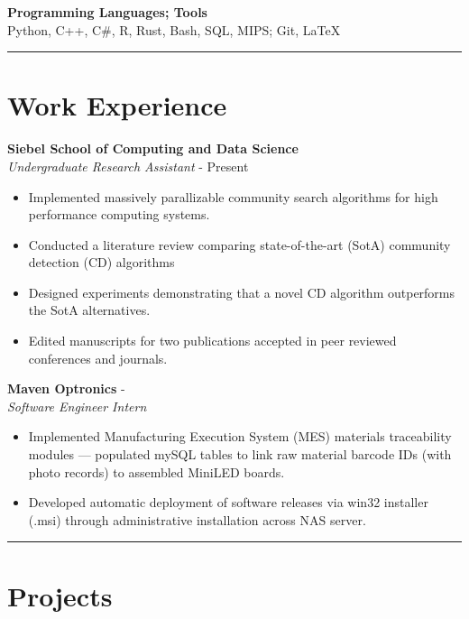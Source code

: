 \documentclass[11pt]{article}
\newcommand{\daterange}[4]{\formatdate{1}{#1}{#2} - \formatdate{1}{#3}{#4}}
\newcommand{\daterangepres}[2]{\formatdate{1}{#1}{#2} - Present}
\begin{document}
\textbf{Programming Languages; Tools} \\
Python, C++, C\#, R, Rust, Bash, SQL, MIPS; Git, \LaTeX \\

\vspace*{-5mm}
\rule{\textwidth}{0.1pt}
\vspace*{-10mm}

\section*{Work Experience}
\vspace*{-2.5mm}

\textbf{Siebel School of Computing and Data Science} \\
\emph{Undergraduate Research Assistant} \hfill \daterangepres{5}{2025}
\begin{itemize}
    \cramped
    \item Implemented massively parallizable community search algorithms for high performance computing systems.
    \item Conducted a literature review comparing state-of-the-art (SotA) community detection (CD) algorithms
    \item Designed experiments demonstrating that a novel CD algorithm outperforms the SotA alternatives.
    \item Edited manuscripts for two publications accepted in peer reviewed conferences and journals.
\end{itemize}

\textbf{Maven Optronics} \hfill \daterange{5}{2024}{8}{2024} \\
\emph{Software Engineer Intern}
\begin{itemize}
    \cramped
    \item Implemented Manufacturing Execution System (MES) materials traceability modules — populated mySQL tables to link raw material barcode IDs (with photo records) to assembled MiniLED boards.
    \item Developed automatic deployment of software releases via win32 installer (.msi) through administrative installation across NAS server.
\end{itemize}

\rule{\textwidth}{0.1pt}
\vspace*{-10mm}

\section*{Projects}
\vspace*{-2.5mm}
\end{document}
